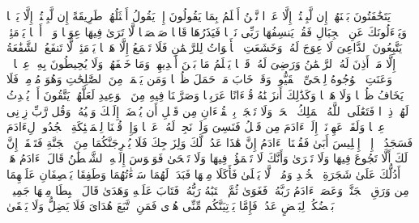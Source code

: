\startbuffer[\q:20:103]
یَتَخَٰفَتُونَ بَیۡنَهُمۡ إِن لَّبِثۡتُمۡ إِلَّا عَشۡرࣰا%
\stopbuffer%
\startbuffer[\q:20:104]
نَّحۡنُ أَعۡلَمُ بِمَا یَقُولُونَ إِذۡ یَقُولُ أَمۡثَلُهُمۡ طَرِیقَةً إِن لَّبِثۡتُمۡ إِلَّا یَوۡمࣰا%
\stopbuffer%
\startbuffer[\q:20:105]
وَیَسۡءَلُونَكَ عَنِ ٱلۡجِبَالِ فَقُلۡ یَنسِفُهَا رَبِّی نَسۡفࣰا%
\stopbuffer%
\startbuffer[\q:20:106]
فَیَذَرُهَا قَاعࣰا صَفۡصَفࣰا%
\stopbuffer%
\startbuffer[\q:20:107]
لَّا تَرَىٰ فِیهَا عِوَجࣰا وَلَاۤ أَمۡتࣰا%
\stopbuffer%
\startbuffer[\q:20:108]
یَوۡمَئِذࣲ یَتَّبِعُونَ ٱلدَّاعِیَ لَا عِوَجَ لَهُۥۖ وَخَشَعَتِ ٱلۡأَصۡوَاتُ لِلرَّحۡمَٰنِ فَلَا تَسۡمَعُ إِلَّا هَمۡسࣰا%
\stopbuffer%
\startbuffer[\q:20:109]
یَوۡمَئِذࣲ لَّا تَنفَعُ ٱلشَّفَٰعَةُ إِلَّا مَنۡ أَذِنَ لَهُ ٱلرَّحۡمَٰنُ وَرَضِیَ لَهُۥ قَوۡلࣰا%
\stopbuffer%
\startbuffer[\q:20:110]
یَعۡلَمُ مَا بَیۡنَ أَیۡدِیهِمۡ وَمَا خَلۡفَهُمۡ وَلَا یُحِیطُونَ بِهِۦ عِلۡمࣰا%
\stopbuffer%
\startbuffer[\q:20:111]
۞ وَعَنَتِ ٱلۡوُجُوهُ لِلۡحَیِّ ٱلۡقَیُّومِۖ وَقَدۡ خَابَ مَنۡ حَمَلَ ظُلۡمࣰا%
\stopbuffer%
\startbuffer[\q:20:112]
وَمَن یَعۡمَلۡ مِنَ ٱلصَّٰلِحَٰتِ وَهُوَ مُؤۡمِنࣱ فَلَا یَخَافُ ظُلۡمࣰا وَلَا هَضۡمࣰا%
\stopbuffer%
\startbuffer[\q:20:113]
وَكَذَٰلِكَ أَنزَلۡنَٰهُ قُرۡءَانًا عَرَبِیࣰّا وَصَرَّفۡنَا فِیهِ مِنَ ٱلۡوَعِیدِ لَعَلَّهُمۡ یَتَّقُونَ أَوۡ یُحۡدِثُ لَهُمۡ ذِكۡرࣰا%
\stopbuffer%
\startbuffer[\q:20:114]
فَتَعَٰلَى ٱللَّهُ ٱلۡمَلِكُ ٱلۡحَقُّۗ وَلَا تَعۡجَلۡ بِٱلۡقُرۡءَانِ مِن قَبۡلِ أَن یُقۡضَىٰۤ إِلَیۡكَ وَحۡیُهُۥۖ وَقُل رَّبِّ زِدۡنِی عِلۡمࣰا%
\stopbuffer%
\startbuffer[\q:20:115]
وَلَقَدۡ عَهِدۡنَاۤ إِلَىٰۤ ءَادَمَ مِن قَبۡلُ فَنَسِیَ وَلَمۡ نَجِدۡ لَهُۥ عَزۡمࣰا%
\stopbuffer%
\startbuffer[\q:20:116]
وَإِذۡ قُلۡنَا لِلۡمَلَٰۤئِكَةِ ٱسۡجُدُوا۟ لِءَادَمَ فَسَجَدُوۤا۟ إِلَّاۤ إِبۡلِیسَ أَبَىٰ%
\stopbuffer%
\startbuffer[\q:20:117]
فَقُلۡنَا یَٰۤءَادَمُ إِنَّ هَٰذَا عَدُوࣱّ لَّكَ وَلِزَوۡجِكَ فَلَا یُخۡرِجَنَّكُمَا مِنَ ٱلۡجَنَّةِ فَتَشۡقَىٰۤ%
\stopbuffer%
\startbuffer[\q:20:118]
إِنَّ لَكَ أَلَّا تَجُوعَ فِیهَا وَلَا تَعۡرَىٰ%
\stopbuffer%
\startbuffer[\q:20:119]
وَأَنَّكَ لَا تَظۡمَؤُا۟ فِیهَا وَلَا تَضۡحَىٰ%
\stopbuffer%
\startbuffer[\q:20:120]
فَوَسۡوَسَ إِلَیۡهِ ٱلشَّیۡطَٰنُ قَالَ یَٰۤءَادَمُ هَلۡ أَدُلُّكَ عَلَىٰ شَجَرَةِ ٱلۡخُلۡدِ وَمُلۡكࣲ لَّا یَبۡلَىٰ%
\stopbuffer%
\startbuffer[\q:20:121]
فَأَكَلَا مِنۡهَا فَبَدَتۡ لَهُمَا سَوۡءَٰتُهُمَا وَطَفِقَا یَخۡصِفَانِ عَلَیۡهِمَا مِن وَرَقِ ٱلۡجَنَّةِۚ وَعَصَىٰۤ ءَادَمُ رَبَّهُۥ فَغَوَىٰ%
\stopbuffer%
\startbuffer[\q:20:122]
ثُمَّ ٱجۡتَبَٰهُ رَبُّهُۥ فَتَابَ عَلَیۡهِ وَهَدَىٰ%
\stopbuffer%
\startbuffer[\q:20:123]
قَالَ ٱهۡبِطَا مِنۡهَا جَمِیعَۢاۖ بَعۡضُكُمۡ لِبَعۡضٍ عَدُوࣱّۖ فَإِمَّا یَأۡتِیَنَّكُم مِّنِّی هُدࣰى فَمَنِ ٱتَّبَعَ هُدَایَ فَلَا یَضِلُّ وَلَا یَشۡقَىٰ%
